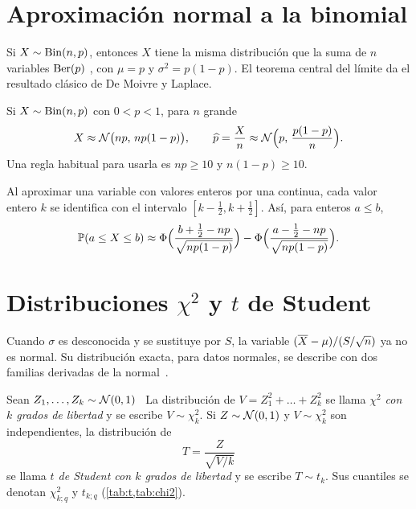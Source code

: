 \addtocounter{definicion}{1}%

\section{Aproximación normal a la binomial}

Si $X\sim\operatorname{Bin}(n,p)$, entonces $X$ tiene la misma distribución que la suma de $n$ variables $\operatorname{Ber}(p)$ \iid, con $\mu=p$ y $\sigma^{2}=p(1-p)$. El teorema central del límite da el resultado clásico de De Moivre y Laplace.

\begin{corolario}\label{cor:t3-binomial}
Si $X\sim\operatorname{Bin}(n,p)$ con $0<p<1$, para $n$ grande
\[
X\approx\mathcal{N}\bigl(np,\,np(1-p)\bigr),\qquad \widehat p=\frac Xn\approx\mathcal{N}\Bigl(p,\,\frac{p(1-p)}{n}\Bigr).
\]
Una regla habitual para usarla es $np\ge10$ y $n(1-p)\ge10$.
\end{corolario}

\begin{definicion}\label{def:t3-cc}
Al aproximar una variable con valores enteros por una continua, cada valor entero $k$ se identifica con el intervalo $[k-\frac12,k+\frac12]$. Así, para enteros $a\le b$,
\[
\mathbb{P}(a\le X\le b)\approx\Phi\Bigl(\frac{b+\frac12-np}{\sqrt{np(1-p)}}\Bigr)-\Phi\Bigl(\frac{a-\frac12-np}{\sqrt{np(1-p)}}\Bigr).
\]
\end{definicion}

\addtocounter{definicion}{1}%

\section{Distribuciones \texorpdfstring{$\chi^{2}$}{chi cuadrado} y \texorpdfstring{$t$}{t} de Student}

Cuando $\sigma$ es desconocida y se sustituye por $S$, la variable $(\overline{X}-\mu)/(S/\sqrt n)$ ya no es normal. Su distribución exacta, para datos normales, se describe con dos familias derivadas de la normal~\cite[§10.4]{bh}.

\begin{definicion}\label{def:t3-chi-t}
Sean $Z_1,\dots,Z_k\sim\mathcal{N}(0,1)$ \iid\ La distribución de $V=Z_1^{2}+\dots+Z_k^{2}$ se llama \emph{$\chi^{2}$ con $k$ grados de libertad} y se escribe $V\sim\chi^{2}_k$. Si $Z\sim\mathcal{N}(0,1)$ y $V\sim\chi^{2}_k$ son independientes, la distribución de
\[
T=\frac{Z}{\sqrt{V/k}}
\]
se llama \emph{$t$ de Student con $k$ grados de libertad} y se escribe $T\sim t_k$. Sus cuantiles se denotan $\chi^{2}_{k;q}$ y $t_{k;q}$ (\cref{tab:t,tab:chi2}).
\end{definicion}

